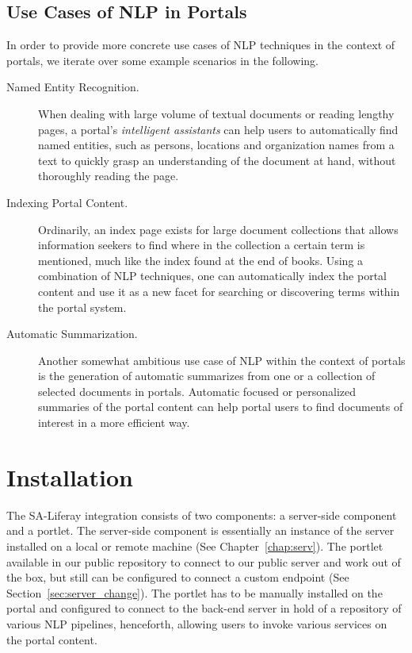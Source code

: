 \subsection{Use Cases of NLP in Portals}
In order to provide more concrete use cases of NLP techniques in the context of portals, we iterate over some example scenarios in the following.

\begin{description}
\item[Named Entity Recognition.] When dealing with large volume of textual documents or reading lengthy pages, a portal's \emph{intelligent assistants} can help users to automatically find named entities, such as persons, locations and organization names from a text to quickly grasp an understanding of the document at hand, without thoroughly reading the page. 
\item[Indexing Portal Content.] Ordinarily, an index page exists for large document collections that allows information seekers to find where in the collection a certain term is mentioned, much like the index found at the end of books. Using a combination of NLP techniques, one can automatically index the portal content and use it as a new facet for searching or discovering terms within the portal system.
\item[Automatic Summarization.] Another somewhat ambitious use case of NLP within the context of portals is the generation of automatic summarizes from one or a collection of selected documents in portals. Automatic focused or personalized summaries of the portal content can help portal users to find documents of interest in a more efficient way.
\end{description}

\noindent

\section{Installation}
The SA-Liferay integration consists of two components: a server-side component and a portlet. The server-side component is essentially an instance of the \sa server installed on a local or remote machine (See Chapter~\ref{chap:serv}). The \sa portlet available in our public repository to connect to our public \sa server and work out of the box, but still can be configured to connect a custom endpoint (See Section~\ref{sec:server_change}). The \sa portlet has to be manually installed on the portal and configured to connect to the back-end \sa server in hold of a repository of various NLP pipelines, henceforth, allowing users to invoke various services on the portal content. 

